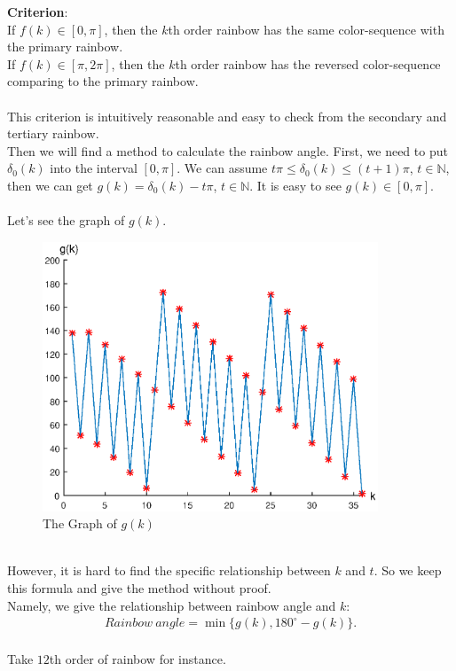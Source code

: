 \documentclass{article}
\begin{document}
\begin{spacing}{1.5}
\textbf{Criterion}: \\
\indent \indent If $f(k)\in[0,\pi]$, then the $k$th order rainbow has the same color-sequence with the primary rainbow.\\
\indent \indent If $f(k)\in[\pi,2\pi]$, then the $k$th order rainbow has the reversed color-sequence comparing to the primary rainbow.\\
\\
This criterion is intuitively reasonable and easy to check from the secondary and tertiary rainbow.\\
Then we will find a method to calculate the rainbow angle. First, we need to put $\delta_0(k)$ into the interval $[0,\pi]$. We can assume $t\pi\leq \delta_0(k)\leq (t+1)\pi$, $t\in\mathbb{N}$, then we can get $g(k)=\delta_0(k)-t\pi$, $t\in\mathbb{N}$. It is easy to see $g(k)\in[0,\pi]$.\\
\\
Let's see the graph of $g(k)$. \\
\begin{figure}[!htb]
\centering
\includegraphics[width=10cm]{Figure3.eps}
\caption{The Graph of $g(k)$}
\end{figure}
\\
However, it is hard to find the specific relationship between $k$ and $t$. So we keep this formula and give the method without proof.\\
Namely, we give the relationship between rainbow angle and $k$:\\
\begin{align*}
Rainbow\ angle=\min\{g(k),180^{\circ}-g(k)\}.
\end{align*}
\ \\
Take $12$th order of rainbow for instance.\\

\end{spacing}
\end{document}
